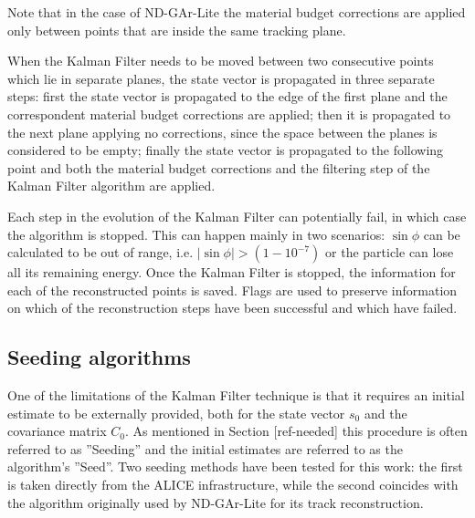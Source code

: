 Note that in the case of ND-GAr-Lite the material budget corrections are applied only between points that are inside the same tracking plane. 

When the Kalman Filter needs to be moved between two consecutive points which lie in separate planes, the state vector is propagated in three separate steps: first the state vector is propagated to the edge of the first plane and the correspondent material budget corrections are applied; then it is propagated to the next plane applying no corrections, since the space between the planes is considered to be empty; finally the state vector is propagated to the following point and both the material budget corrections and the filtering step of the Kalman Filter algorithm are applied.

Each step in the evolution of the Kalman Filter can potentially fail, in which case the algorithm is stopped. This can happen mainly in two scenarios: $\sin \phi$ can be calculated to be out of range, i.e. $|\sin \phi|>(1-10^{-7})$ or the particle can lose all its remaining energy. Once the Kalman Filter is stopped, the information for each of the reconstructed points is saved. Flags are used to preserve information on which of the reconstruction steps have been successful and which have failed.


\subsection{Seeding algorithms}
\label{Sec:SeedingLite}
One of the limitations of the Kalman Filter technique is that it requires an initial estimate to be externally provided, both for the state vector $s_0$ and the covariance matrix $C_0$. As mentioned in
Section [ref-needed] this procedure is often referred to as ''Seeding'' and the initial estimates are referred to as the algorithm’s ''Seed''. Two seeding methods have been tested for this work: the first is taken directly from the ALICE infrastructure, while the second coincides with the algorithm originally used by ND-GAr-Lite for its track reconstruction.


